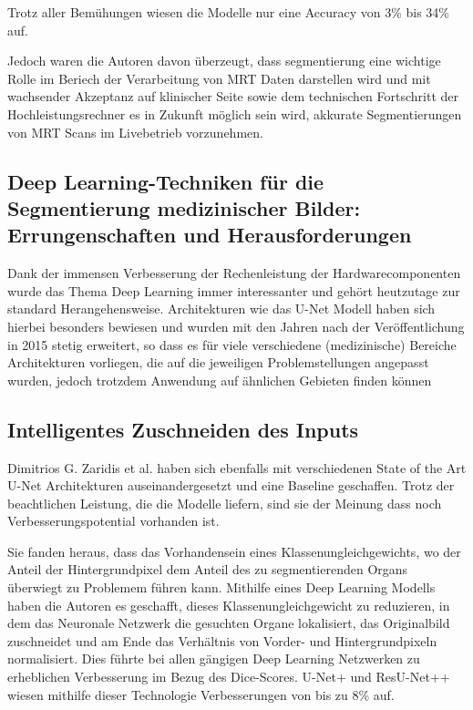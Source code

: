 Trotz aller Bemühungen wiesen die Modelle nur eine Accuracy von 3\% bis 34\% auf. \citep{Clarke:Mri1995}

Jedoch waren die Autoren davon überzeugt, dass segmentierung eine wichtige Rolle im Beriech der Verarbeitung von MRT Daten darstellen wird und mit wachsender Akzeptanz auf klinischer Seite sowie dem technischen Fortschritt der Hochleistungsrechner es in Zukunft möglich sein wird, akkurate Segmentierungen von MRT Scans im Livebetrieb vorzunehmen.

\newpage

\subsection{Deep Learning-Techniken für die Segmentierung medizinischer Bilder:
Errungenschaften und Herausforderungen}

Dank der immensen Verbesserung der Rechenleistung der Hardwarecomponenten wurde das Thema Deep Learning immer interessanter und gehört heutzutage zur standard Herangehensweise. Architekturen wie das U-Net Modell \citep{U-Net} haben sich hierbei besonders bewiesen und wurden mit den Jahren nach der Veröffentlichung in 2015 stetig erweitert, so dass es für viele verschiedene (medizinische) Bereiche Architekturen vorliegen, die auf die jeweiligen Problemstellungen angepasst wurden, jedoch trotzdem Anwendung auf ähnlichen Gebieten finden können \citep{Hesamian}

\subsection{Intelligentes Zuschneiden des Inputs}

Dimitrios G. Zaridis et al. \citep{SmartCrop} haben sich ebenfalls mit verschiedenen State of the Art U-Net Architekturen auseinandergesetzt und eine Baseline geschaffen. Trotz der beachtlichen Leistung, die die Modelle liefern, sind sie der Meinung dass noch Verbesserungspotential vorhanden ist.

Sie fanden heraus, dass das Vorhandensein eines Klassenungleichgewichts, wo der Anteil der Hintergrundpixel dem Anteil des zu segmentierenden Organs überwiegt zu Problemem führen kann. Mithilfe eines Deep Learning Modells haben die Autoren es geschafft, dieses Klassenungleichgewicht zu reduzieren, in dem das Neuronale Netzwerk die gesuchten Organe lokalisiert, das Originalbild zuschneidet und am Ende das Verhältnis von Vorder- und Hintergrundpixeln normalisiert. Dies führte bei allen gängigen Deep Learning Netzwerken zu erheblichen Verbesserung im Bezug des Dice-Scores. U-Net+ und ResU-Net++ wiesen mithilfe dieser Technologie Verbesserungen von bis zu 8\% auf.

